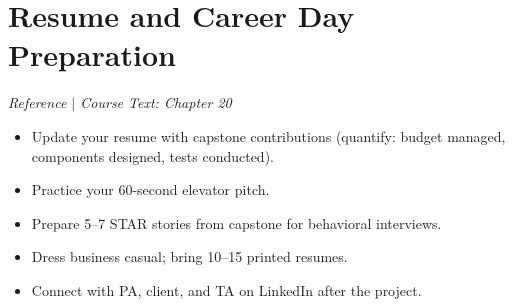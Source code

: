 \section{Resume and Career Day Preparation}
\textit{Reference $|$ Course Text: Chapter 20}

\begin{itemize}[nosep,leftmargin=1.5em]
\item Update your resume with capstone contributions (quantify: budget managed, components designed, tests conducted).
\item Practice your 60-second elevator pitch.
\item Prepare 5--7 STAR stories from capstone for behavioral interviews.
\item Dress business casual; bring 10--15 printed resumes.
\item Connect with PA, client, and TA on LinkedIn after the project.
\end{itemize}


